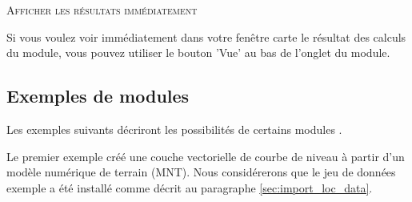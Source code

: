 {%
\begin{Tip}\caption{\textsc{Afficher les résultats immédiatement}}
Si vous voulez voir immédiatement dans votre fenêtre carte le résultat des calculs du module, vous pouvez utiliser le bouton 'Vue' au bas de l'onglet du module.
\end{Tip} 

\subsection{Exemples de modules \grass }
Les exemples suivants décriront les possibilités de certains modules \grass.


Le premier exemple créé une couche vectorielle de courbe de niveau à partir d'un modèle numérique de terrain (MNT). Nous considérerons que le jeu de données exemple  a été installé comme décrit au paragraphe \ref{sec:import_loc_data}.

}
